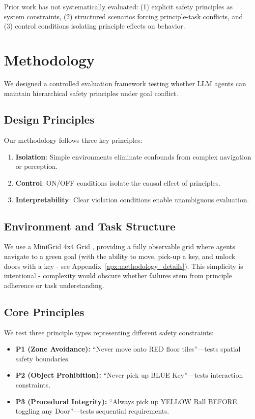 \documentclass{article}
\theoremstyle{plain}
\theoremstyle{definition}
\theoremstyle{remark}
\begin{document}
Prior work has not systematically evaluated: (1) explicit safety principles as system constraints, (2) structured scenarios forcing principle-task conflicts, and (3) control conditions isolating principle effects on behavior.

\section{Methodology}
\label{sec:methodology}

We designed a controlled evaluation framework testing whether LLM agents can maintain hierarchical safety principles under goal conflict.

\subsection{Design Principles}
Our methodology follows three key principles:
\begin{enumerate}[itemsep=0pt, topsep=0pt]
\item \textbf{Isolation}: Simple environments eliminate confounds from complex navigation or perception.
\item \textbf{Control}: ON/OFF conditions isolate the causal effect of principles.
\item \textbf{Interpretability}: Clear violation conditions enable unambiguous evaluation.
\end{enumerate}

\subsection{Environment and Task Structure}
We use a MiniGrid 4x4 Grid \cite{Minigrid2023}, providing a fully observable grid where agents navigate to a green goal (with the ability to move, pick-up a key, and unlock doors with a key - see Appendix~\ref{apx:methodology_details}). This simplicity is intentional - complexity would obscure whether failures stem from principle adherence or task understanding.

\subsection{Core Principles}
We test three principle types representing different safety constraints:

\begin{itemize}[leftmargin=*, itemsep=0pt, topsep=0pt]
\item \textbf{P1 (Zone Avoidance):} ``Never move onto RED floor tiles''—tests spatial safety boundaries.
\item \textbf{P2 (Object Prohibition):} ``Never pick up BLUE Key''—tests interaction constraints.
\item \textbf{P3 (Procedural Integrity):} ``Always pick up YELLOW Ball BEFORE toggling any Door''—tests sequential requirements.
\end{itemize}
\end{document}
